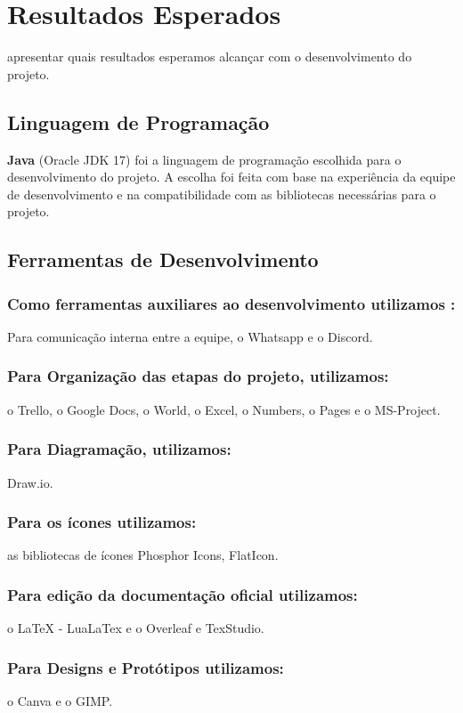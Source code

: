 \documentclass[../main.tex]{subfiles}
\begin{document}
\section{Resultados Esperados}
apresentar quais resultados esperamos alcançar com o desenvolvimento do projeto.

\subsection{Linguagem de Programação}
\textbf{Java} (Oracle JDK 17) foi a linguagem de programação escolhida para o desenvolvimento do projeto.
A escolha foi feita com base na experiência da equipe de desenvolvimento e na compatibilidade 
com as bibliotecas necessárias para o projeto.
\subsection{Ferramentas de Desenvolvimento}
    \subsubsection{Como ferramentas auxiliares ao desenvolvimento utilizamos :}
    Para comunicação interna entre a equipe, o Whatsapp e o Discord.
    \subsubsection{Para Organização das etapas do projeto, utilizamos:}
    o Trello, o Google Docs, o World, o Excel, o Numbers, o Pages e o MS-Project.
    \subsubsection{Para Diagramação, utilizamos: }
    Draw.io.
    \subsubsection{Para os ícones utilizamos:}
     as bibliotecas de ícones Phosphor Icons, FlatIcon.
    \subsubsection{Para edição da documentação oficial utilizamos:}
     o LaTeX - LuaLaTex e o Overleaf e TexStudio.
    \subsubsection{Para Designs e Protótipos utilizamos:}
    o Canva e o GIMP.


\end{document}

